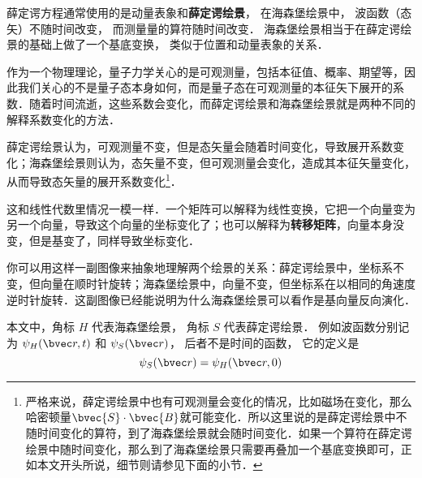 



薛定谔方程通常使用的是动量表象和\textbf{薛定谔绘景}， 在海森堡绘景中， 波函数（态矢）不随时间改变， 而测量量的算符随时间改变． 海森堡绘景相当于在薛定谔绘景的基础上做了一个基底变换， 类似于位置和动量表象的关系．



作为一个物理理论，量子力学关心的是可观测量，包括本征值、概率、期望等，因此我们关心的不是量子态本身如何，而是量子态在可观测量的本征矢下展开的系数．随着时间流逝，这些系数会变化，而薛定谔绘景和海森堡绘景就是两种不同的解释系数变化的方法．

薛定谔绘景认为，可观测量不变，但是态矢量会随着时间变化，导致展开系数变化；海森堡绘景则认为，态矢量不变，但可观测量会变化，造成其本征矢量变化，从而导致态矢量的展开系数变化\footnote{严格来说，薛定谔绘景中也有可观测量会变化的情况，比如磁场在变化，那么哈密顿量$\bvec{S}\cdot \bvec{B}$就可能变化．所以这里说的是薛定谔绘景中不随时间变化的算符，到了海森堡绘景就会随时间变化．如果一个算符在薛定谔绘景中随时间变化，那么到了海森堡绘景只需要再叠加一个基底变换即可，正如本文开头所说，细节则请参见下面的小节．}．

这和线性代数里情况一模一样．一个矩阵可以解释为线性变换，它把一个向量变为另一个向量，导致这个向量的坐标变化了；也可以解释为\textbf{转移矩阵}，向量本身没变，但是基变了，同样导致坐标变化．

你可以用这样一副图像来抽象地理解两个绘景的关系：薛定谔绘景中，坐标系不变，但向量在顺时针旋转；海森堡绘景中，向量不变，但坐标系在以相同的角速度逆时针旋转．这副图像已经能说明为什么海森堡绘景可以看作是基向量反向演化．



本文中，角标 $H$ 代表海森堡绘景， 角标 $S$ 代表薛定谔绘景． 例如波函数分别记为 $\psi_H(\bvec r, t)$ 和 $\psi_S(\bvec r)$， 后者不是时间的函数， 它的定义是
\begin{equation}
\psi_S(\bvec r) = \psi_H(\bvec r, 0)
\end{equation}



